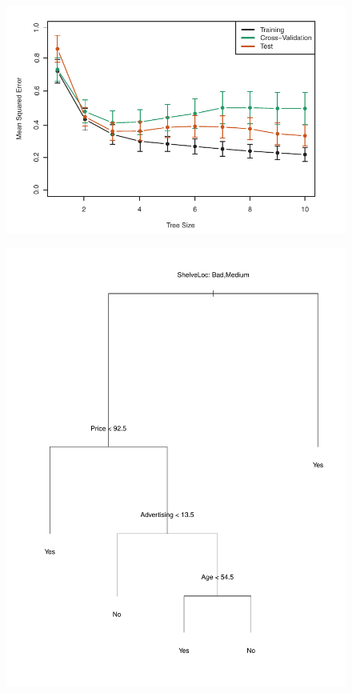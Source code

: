 \documentclass{beamer}
\theoremstyle{definition}
\begin{document}
\begin{frame}
\begin{figure}[h!]
\includegraphics[scale=0.4]{prunning}
\end{figure}
\end{frame}

\begin{frame}
\begin{figure}[h!]
\includegraphics[scale=0.28]{grafo1}
\end{figure}
\end{frame}
\end{document}
